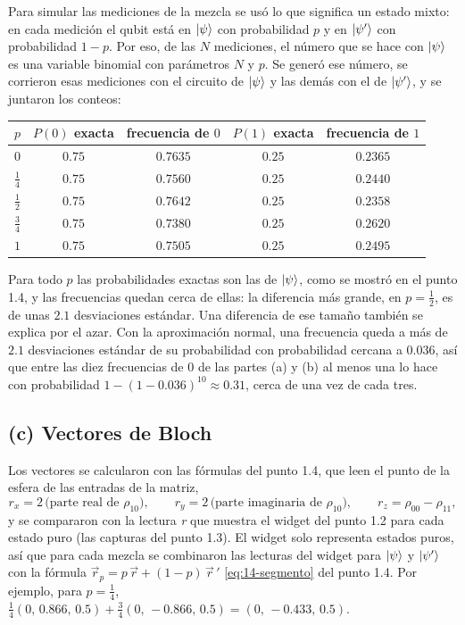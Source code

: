 Para simular las mediciones de la mezcla se usó lo que significa un estado mixto: en cada
medición el qubit está en $\lvert \psi\rangle$ con probabilidad $p$ y en $\lvert \psi'\rangle$ con probabilidad
$1-p$. Por eso, de las $N$ mediciones, el número que se hace con $\lvert \psi\rangle$ es una variable
binomial con parámetros $N$ y $p$. Se generó ese número, se corrieron esas mediciones con el
circuito de $\lvert \psi\rangle$ y las demás con el de $\lvert \psi'\rangle$, y se juntaron los conteos:

\begin{center}
\renewcommand{\arraystretch}{1.3}
\begin{tabular}{ccccc}
  $p$ & $P(0)$ exacta & frecuencia de $0$ & $P(1)$ exacta & frecuencia de $1$\\\hline
  $0$ & $0.75$ & $0.7635$ & $0.25$ & $0.2365$\\
  $\frac14$ & $0.75$ & $0.7560$ & $0.25$ & $0.2440$\\
  $\frac12$ & $0.75$ & $0.7642$ & $0.25$ & $0.2358$\\
  $\frac34$ & $0.75$ & $0.7380$ & $0.25$ & $0.2620$\\
  $1$ & $0.75$ & $0.7505$ & $0.25$ & $0.2495$
\end{tabular}
\end{center}

Para todo $p$ las probabilidades exactas son las de $\lvert \psi\rangle$, como se mostró en el punto 1.4, y
las frecuencias quedan cerca de ellas: la diferencia más grande, en $p=\frac12$, es de unas
$2.1$ desviaciones estándar. Una diferencia de ese tamaño también se explica por el azar. Con la
aproximación normal, una frecuencia queda a más de $2.1$ desviaciones estándar de su
probabilidad con probabilidad cercana a $0.036$, así que entre las diez frecuencias de $0$ de las
partes (a) y (b) al menos una lo hace con probabilidad $1-(1-0.036)^{10}\approx0.31$, cerca de
una vez de cada tres.

\subsection*{(c) Vectores de Bloch}

Los vectores se calcularon con las fórmulas del punto 1.4, que leen el punto de la esfera de las
entradas de la matriz,
\[
  r_x=2\,\bigl(\text{parte real de }\rho_{10}\bigr),\qquad
  r_y=2\,\bigl(\text{parte imaginaria de }\rho_{10}\bigr),\qquad
  r_z=\rho_{00}-\rho_{11},
\]
y se compararon con la lectura \emph{r} que muestra el widget del punto 1.2 para cada estado
puro (las capturas del punto 1.3). El widget solo representa estados puros, así que para cada
mezcla se combinaron las lecturas del widget para $\lvert \psi\rangle$ y $\lvert \psi'\rangle$ con la fórmula
$\vec r_p=p\,\vec r+(1-p)\,\vec r\,'$ \eqref{eq:14-segmento} del punto 1.4. Por ejemplo, para
$p=\frac14$, $\frac14(0,\,0.866,\,0.5)+\frac34(0,\,-0.866,\,0.5)=(0,\,-0.433,\,0.5)$.

